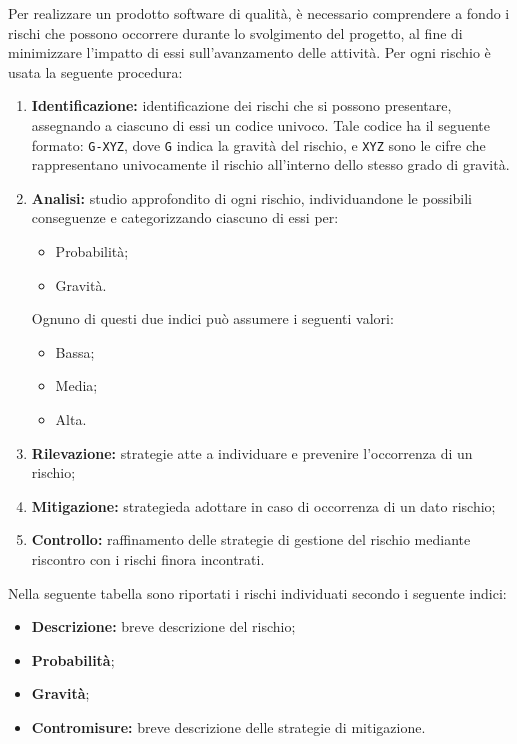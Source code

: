 Per realizzare un prodotto software di {qualità}, è necessario
comprendere a fondo i rischi che possono occorrere durante lo svolgimento
del progetto, al fine di minimizzare l'impatto di essi sull'avanzamento
delle {attività}. \newline
Per ogni rischio è usata la seguente procedura:
\begin{enumerate}
    \item \textbf{Identificazione:}
           identificazione dei rischi che si possono presentare, assegnando a ciascuno di essi un codice univoco. Tale codice ha il seguente formato: \texttt{G-XYZ}, dove \texttt{G} indica la gravità del rischio, e \texttt{XYZ} sono le cifre che rappresentano univocamente il rischio all'interno dello stesso grado di gravità.
    \item \textbf{Analisi:} studio approfondito di ogni rischio, individuandone le possibili conseguenze e categorizzando ciascuno di essi per:
           \begin{itemize}
               \item Probabilità;
               \item Gravità.
           \end{itemize}
           Ognuno di questi due indici può assumere i seguenti valori:
           \begin{itemize}
               \item Bassa;
               \item Media;
               \item Alta.
           \end{itemize}
    \item \textbf{Rilevazione: }strategie atte a individuare e prevenire l'occorrenza di un rischio;
    \item \textbf{Mitigazione: }{strategie}\space da adottare in caso di occorrenza di un dato rischio;
    \item \textbf{Controllo:} raffinamento delle strategie di gestione del rischio mediante riscontro con i rischi
                              finora incontrati.
\end{enumerate}                         
Nella seguente tabella sono riportati i rischi individuati secondo i seguente indici:
\begin{itemize}
	\item \textbf{Descrizione: }breve descrizione del rischio; 
	\item \textbf{Probabilità};
    \item \textbf{Gravità};
    \item \textbf{Contromisure: }breve descrizione delle strategie di mitigazione.

\end{itemize}

